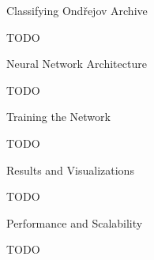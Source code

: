\chap Classifying Ondřejov Archive

TODO

\sec Neural Network Architecture

TODO

\sec Training the Network

TODO

\sec Results and Visualizations

TODO

\sec Performance and Scalability

TODO
